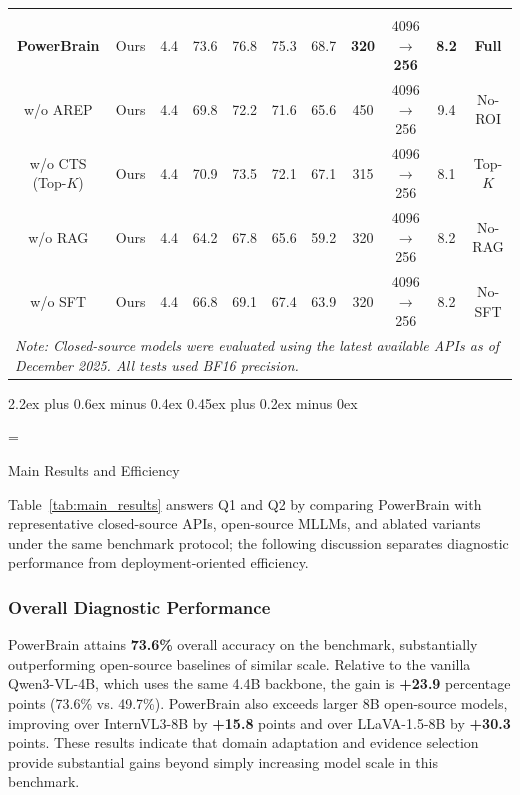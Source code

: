 \documentclass[journal,twoside,web]{ieeecolor}
\makeatletter
\renewcommand{\subsection}{\@startsection{subsection}{2}{\z@}%
  {2.2ex plus 0.6ex minus 0.4ex}%
  {0.45ex plus 0.2ex minus 0ex}%
  {\color{myorange}\normalsize\normalfont\everymath={\sf}\sf\itshape\raggedright}}
\makeatother
\begin{document}
\begin{table}[!t]
\begin{tabular*}{0.98\textwidth}{@{\extracolsep{\fill}} *{11}{c} @{}}
    \rowcolor{tableblue} \multicolumn{11}{c}{\textit{Ours / Variants (Backbone: Qwen3-VL-4B)}} \\
    \textbf{PowerBrain} & Ours & 4.4 & 73.6 & 76.8 & 75.3 & 68.7 & \textbf{320} & 4096 $\rightarrow$ \textbf{256} & \textbf{8.2} & \textbf{Full} \\
    \quad w/o AREP & Ours & 4.4 & 69.8 & 72.2 & 71.6 & 65.6 & 450 & 4096 $\rightarrow$ 256 & 9.4 & No-ROI \\
    \quad w/o CTS (Top-$K$) & Ours & 4.4 & 70.9 & 73.5 & 72.1 & 67.1 & 315 & 4096 $\rightarrow$ 256 & 8.1 & Top-$K$ \\
    \quad w/o RAG & Ours & 4.4 & 64.2 & 67.8 & 65.6 & 59.2 & 320 & 4096 $\rightarrow$ 256 & 8.2 & No-RAG \\
    \quad w/o SFT & Ours & 4.4 & 66.8 & 69.1 & 67.4 & 63.9 & 320 & 4096 $\rightarrow$ 256 & 8.2 & No-SFT \\
    \midrule

    \multicolumn{11}{l}{\scriptsize \textit{Note: Closed-source models were evaluated using the latest available APIs as of December 2025. All tests used BF16 precision.}} \\
    \bottomrule
  \end{tabular*}
\end{table}

\subsection{Main Results and Efficiency}
\label{sec:main_results_efficiency}

Table~\ref{tab:main_results} answers Q1 and Q2 by comparing PowerBrain with representative closed-source APIs, open-source MLLMs, and ablated variants under the same benchmark protocol; the following discussion separates diagnostic performance from deployment-oriented efficiency.

\subsubsection{Overall Diagnostic Performance}
PowerBrain attains \textbf{73.6\%} overall accuracy on the benchmark, substantially outperforming open-source baselines of similar scale. Relative to the vanilla Qwen3-VL-4B, which uses the same 4.4B backbone, the gain is \textbf{+23.9} percentage points (73.6\% vs. 49.7\%). PowerBrain also exceeds larger 8B open-source models, improving over InternVL3-8B by \textbf{+15.8} points and over LLaVA-1.5-8B by \textbf{+30.3} points.
These results indicate that domain adaptation and evidence selection provide substantial gains beyond simply increasing model scale in this benchmark.
\end{document}
